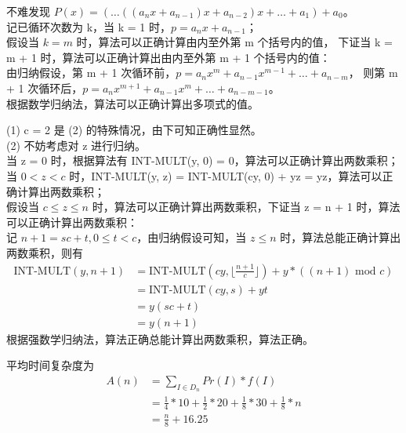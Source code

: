 \documentclass[12pt, a4paper, oneside]{ctexart}
\begin{document}
\begin{solution}[1.7]
不难发现 $P(x) = ( \dots ((a_n x + a_{n - 1})x + a_{n - 2})x + \dots + a_1) + a_0$。
\\记已循环次数为 k，当 k = 1 时，$p = a_n x + a_{n - 1}$；
\\假设当 $k = m$ 时，算法可以正确计算由内至外第 m 个括号内的值，
下证当 k = m + 1 时，算法可以正确计算出由内至外第 m + 1 个括号内的值：
\\由归纳假设，第 m + 1 次循环前，$p = a_n x^{m} + a_{n - 1} x^{m - 1} + \dots + a_{n - m}$，
则第 m + 1 次循环后，$p = a_n x^{m + 1} + a_{n - 1} x^m + \dots + a_{n - m - 1}$。
\\根据数学归纳法，算法可以正确计算出多项式的值。
\end{solution}

\begin{solution}[1.8]
(1) c = 2 是 (2) 的特殊情况，由下可知正确性显然。
\\(2) 不妨考虑对 z 进行归纳。
\\当 z = 0 时，根据算法有 INT-MULT(y, 0) = 0，算法可以正确计算出两数乘积；
\\当 $0 < z < c$ 时，INT-MULT(y, z) = INT-MULT(cy, 0) + yz = yz，算法可以正确计算出两数乘积；
\\假设当 $c \leq z \leq n$ 时，算法可以正确计算出两数乘积，下证当 z = n + 1 时，算法可以正确计算出两数乘积：
\\记 $n + 1 = sc + t, 0 \leq t < c$，由归纳假设可知，当 $z \leq n$ 时，算法总能正确计算出两数乘积，则有
\begin{align*}
    \text{INT-MULT}(y, n + 1) &= \text{INT-MULT}(cy, \lfloor \frac{n + 1}{c} \rfloor) + y * ((n + 1) \text{ mod } c) \\
    &= \text{INT-MULT}(cy, s) + yt \\
    &= y(sc + t) \\
    &= y(n + 1)  
\end{align*}
根据强数学归纳法，算法正确总能计算出两数乘积，算法正确。
\end{solution}

\newpage
\begin{solution}[1.9]
平均时间复杂度为
\begin{align*}
    A(n) &= \sum_{I \in D_n} Pr(I) * f(I) \\
    &= \frac{1}{4} * 10 + \frac{1}{2} * 20 + \frac{1}{8} * 30 + \frac{1}{8} * n \\
    &= \frac{n}{8} + 16.25
\end{align*}
\end{solution}
\end{document}

